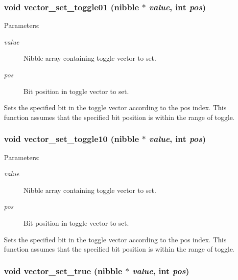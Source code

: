 \subsubsection{\setlength{\rightskip}{0pt plus 5cm}void vector\_\-set\_\-toggle01 ({\bf nibble} $\ast$ {\em value}, int {\em pos})}\label{vector_8c_a20}


\begin{Desc}
\item[Parameters:]
\begin{description}
\item[{\em value}]Nibble array containing toggle vector to set. \item[{\em pos}]Bit position in toggle vector to set.\end{description}
\end{Desc}
Sets the specified bit in the toggle vector according to the pos index. This function assumes that the specified bit position is within the range of toggle. 
\subsubsection{\setlength{\rightskip}{0pt plus 5cm}void vector\_\-set\_\-toggle10 ({\bf nibble} $\ast$ {\em value}, int {\em pos})}\label{vector_8c_a21}


\begin{Desc}
\item[Parameters:]
\begin{description}
\item[{\em value}]Nibble array containing toggle vector to set. \item[{\em pos}]Bit position in toggle vector to set.\end{description}
\end{Desc}
Sets the specified bit in the toggle vector according to the pos index. This function assumes that the specified bit position is within the range of toggle. 
\subsubsection{\setlength{\rightskip}{0pt plus 5cm}void vector\_\-set\_\-true ({\bf nibble} $\ast$ {\em value}, int {\em pos})}\label{vector_8c_a23}


